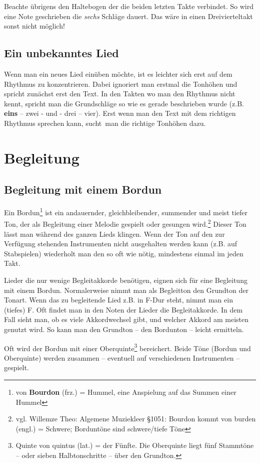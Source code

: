 \documentclass[10pt,a4paper,twoside]{report}
\newcommand{\comment}[1]{
	\marginpar{
		\textsf{#1}
	}
}
\begin{document}
Beachte übrigens den Haltebogen der die beiden letzten Takte verbindet. So wird
eine Note geschrieben die \emph{sechs} Schläge dauert. Das wäre in einen Dreivierteltakt sonst nicht möglich!

\section{Ein unbekanntes Lied}
Wenn man ein neues Lied einüben möchte, ist es leichter sich erst auf dem Rhythmus zu 
konzentrieren. Dabei ignoriert man erstmal die Tonhöhen und spricht zunächst erst 
den Text. In den Takten wo man den Rhythmus nicht kennt, spricht man die Grundschläge
so wie es gerade beschrieben wurde (z.B. \textbf{eins} -- zwei - und - drei -- vier).
Erst wenn man den Text mit dem richtigen Rhythmus sprechen kann, \glqq sucht\grqq\ man 
die richtige Tonhöhen dazu.

\chapter{Begleitung}
\section{Begleitung mit einem Bordun}
Ein Bordun\footnote{von \textbf{Bourdon} (frz.) = Hummel, eine Anspielung auf das Summen einer Hummel}
ist ein andauernder, gleichbleibender, summender und meist tiefer Ton, \comment{Bordun = 
ein tiefes Summen} der als Begleitung einer Melodie gespielt oder gesungen wird.\footnote{vgl. Willemze Theo: 
Algemene Muziekleer §1051: Bourdon kommt von burden (engl.) = Schwere; 
Borduntöne sind schwere/tiefe Töne}
Dieser Ton lässt man während des ganzen Lieds klingen. Wenn der Ton auf den zur Verfügung stehenden Instrumenten
nicht ausgehalten werden kann (z.B. auf Stabspielen) wiederholt man den so oft wie nötig, mindestens 
einmal im jeden Takt.

Lieder die nur wenige Begleitakkorde benötigen, eignen sich für eine Begleitung mit einem Bordun. 
Normalerweise nimmt man als Begleitton den Grundton der Tonart. Wenn das zu begleitende Lied z.B. 
in F-Dur steht, nimmt man ein (tiefes) F. Oft findet man in den Noten der Lieder die Begleitakkorde.
In dem Fall sieht man, ob es viele Akkordwechsel gibt, und welcher Akkord am meisten genutzt wird. 
So kann man den Grundton -- den Bordunton -- leicht ermitteln.

Oft wird der Bordun mit einer Oberquinte\footnote{Quinte von quintus (lat.) = der Fünfte.
Die Oberquinte
liegt fünf Stammtöne -- oder sieben Halbtonschritte -- über den Grundton.} \comment{Oberquinte} bereichert.
Beide Töne (Bordun und Oberquinte) werden zusammen
-- eventuell auf verschiedenen Instrumenten -- gespielt. 
\end{document}
